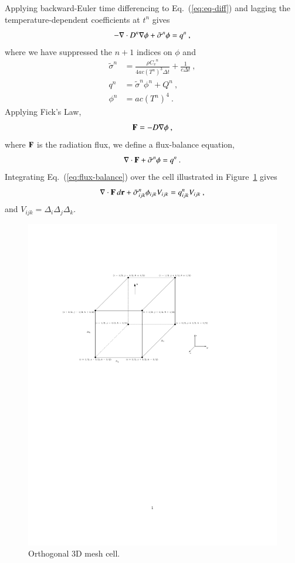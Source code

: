 \documentclass[preprint,12pt]{elsarticle}
\newcommand{\Cv}{\ensuremath{C_{v}}}
\newcommand{\dt}{\ensuremath{\Delta t}}
\newcommand{\sign}{\ensuremath{\tilde{\sigma}^n}}
\newcommand{\qn}{\ensuremath{q^n}} \newcommand{\Tn}{\ensuremath{T^n}}
\newcommand{\Dn}{\ensuremath{D^n}}
\newcommand{\phin}{\ensuremath{\phi^n}}
\begin{document}
Applying backward-Euler time differencing to Eq.~(\ref{eq:eq-diff}) and
lagging the temperature-dependent coefficients at $t^n$ gives
\begin{equation}
  -\nabla\cdot \Dn\grad{\phi} + \sign\phi = \qn\:,
\end{equation}
where we have suppressed the $n+1$ indices on $\phi$ and
\begin{align}
  \sign &= \frac{\rho \Cv^n}{4ac(\Tn)^3\dt} + \frac{1}{c\dt}\:,\\ \qn
  &= \sign\phin + Q^n\:,\\ \phin &= ac(\Tn)^4\:.
\end{align}
Applying Fick's Law,
\begin{equation}
  \mathbf{F} = -D\nabla \phi\:,
  \label{eq:fick}
\end{equation}
where $\mathbf{F}$ is the radiation flux, we define a flux-balance equation,
\begin{equation}
  \dive{F} + \sign\phi = \qn\:.
  \label{eq:flux-balance}
\end{equation}
Integrating Eq.~(\ref{eq:flux-balance}) over the cell illustrated in
Figure~\ref{fig:cell} gives
\begin{equation}
  \iiint\dive{F}\,d\ve{r} +
  \sign_{ijk}\phi_{ijk}V_{ijk}=\qn_{ijk}V_{ijk}\:,
  \label{eq:flux-balance-vol-integral}
\end{equation}
and $V_{ijk} = \Delta_i\Delta_j\Delta_k$.
\begin{figure}[ht!]
  \centerline{ \includegraphics[clip]{mesh_cell.pdf} }
  \caption{Orthogonal 3D mesh cell.}
  \label{fig:cell}
\end{figure}
\end{document}
